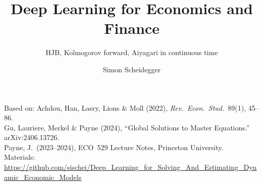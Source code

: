 \documentclass[aspectratio=169,11pt]{beamer}
\title[Deep Learning for Dynamic Economic Models]
{Deep Learning for Economics and Finance}
\subtitle{HJB, Kolmogorov forward, Aiyagari in continuous time}
\author{Simon Scheidegger}
\institute[HEC Lausanne]{HEC, University of Lausanne}
\date{}
\begin{document}
\newcommand{\exercisepause}{%
  \tikz[baseline=(X.base)]{\node[fill=darkgreen!80!black, text=white,
  rounded corners=2pt, inner sep=3pt, font=\scriptsize\bfseries](X){PAUSE --- 5 min};}}



{
\begin{frame}
\titlepage
\vspace{-0.4cm}
\begin{center}
{\footnotesize Based on: Achdou, Han, Lasry, Lions \& Moll (2022), \emph{Rev.\ Econ.\ Stud.}\ 89(1), 45--86.}\\[2pt]
{\footnotesize Gu, Lauriere, Merkel \& Payne (2024), ``Global Solutions to Master Equations.'' arXiv:2406.13726.}\\[2pt]
{\footnotesize Payne, J.\ (2023--2024), ECO~529 Lecture Notes, Princeton University.}\\[4pt]
{\footnotesize Materials: \url{https://github.com/sischei/Deep_Learning_for_Solving_And_Estimating_Dynamic_Economic_Models}}
\end{center}
\end{frame}
}
\end{document}
